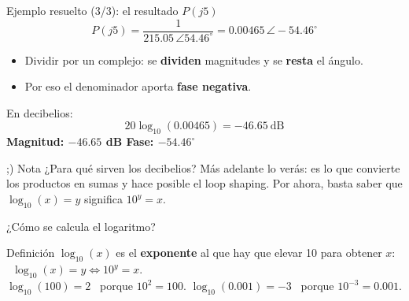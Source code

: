 \documentclass[aspectratio=169,11pt]{beamer}
\newcommand{\ang}[1]{\angle #1^\circ}
\begin{document}
\begin{frame}{Ejemplo resuelto (3/3): el resultado $P(j5)$}
  \[
    P(j5)=\frac{1}{215.05\,\ang{54.46}}
    = 0.00465\,\ang{-54.46}
  \]
  \begin{itemize}
    \item Dividir por un complejo: se \textbf{dividen} magnitudes y se \textbf{resta} el ángulo.
    \item Por eso el denominador aporta \textbf{fase negativa}.
  \end{itemize}
  \vspace{4pt}
  En decibelios:
  \[
    20\log_{10}(0.00465) = \boxed{-46.65\ \text{dB}}
  \]
  \centering
  \textbf{Magnitud: $-46.65$ dB \qquad Fase: $-54.46^\circ$}

  \vspace{6pt}
  \begin{block}{;) Nota}
    \footnotesize
    ¿Para qué sirven los decibelios? Más adelante lo verás: es lo que convierte los productos en sumas y hace posible el loop shaping. Por ahora, basta saber que $\log_{10}(x)=y$ significa $10^y=x$.
  \end{block}
\end{frame}

\begin{frame}{¿Cómo se calcula el logaritmo?}
  \small
  \setlength{\parskip}{2pt}
  \begin{block}{Definición}
    $\log_{10}(x)$ es el \textbf{exponente} al que hay que elevar 10 para obtener $x$: \ $\log_{10}(x)=y \iff 10^y=x$.\\
    $\log_{10}(100)=2$ \ porque $10^2=100$. \qquad $\log_{10}(0.001)=-3$ \ porque $10^{-3}=0.001$.
  \end{block}


\end{frame}
\end{document}
